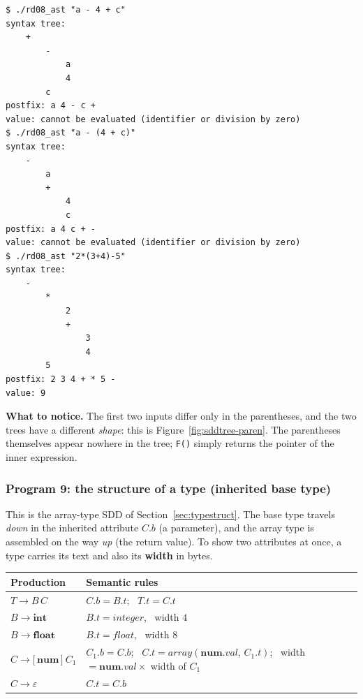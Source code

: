 \documentclass[11pt,a4paper]{article}
\newcommand{\at}[2]{\ensuremath{#1.\mathit{#2}}}
\newcommand{\tok}[1]{\ensuremath{\mathtt{#1}}}
\begin{document}
\begin{lstlisting}[basicstyle=\ttfamily\footnotesize,tabsize=4]
$ ./rd08_ast "a - 4 + c"
syntax tree:
    +
        -
            a
            4
        c
postfix: a 4 - c + 
value: cannot be evaluated (identifier or division by zero)
$ ./rd08_ast "a - (4 + c)"
syntax tree:
    -
        a
        +
            4
            c
postfix: a 4 c + - 
value: cannot be evaluated (identifier or division by zero)
$ ./rd08_ast "2*(3+4)-5"
syntax tree:
    -
        *
            2
            +
                3
                4
        5
postfix: 2 3 4 + * 5 - 
value: 9
\end{lstlisting}

\textbf{What to notice.} The first two inputs differ only in the parentheses, and the two trees have a different \emph{shape}: this is Figure~\ref{fig:sddtree-paren}. The parentheses themselves appear nowhere in the tree; \texttt{F()} simply returns the pointer of the inner expression.

\subsubsection*{Program 9: the structure of a type (inherited base type)}
This is the array-type SDD of Section~\ref{sec:typestruct}. The base type travels \emph{down} in the inherited attribute $C.b$ (a parameter), and the array type is assembled on the way \emph{up} (the return value). To show two attributes at once, a type carries its text and also its \textbf{width} in bytes.
\begin{center}
\small
\begin{tabular}{@{}l l@{}}
\toprule
\textbf{Production} & \textbf{Semantic rules} \\ \midrule
$T \to B\,C$ & $\at{C}{b}=\at{B}{t}$; \ $\at{T}{t}=\at{C}{t}$ \\
$B \to \mathbf{int}$ & $\at{B}{t}=\mathit{integer}$, \ width $4$ \\
$B \to \mathbf{float}$ & $\at{B}{t}=\mathit{float}$, \ width $8$ \\
$C \to \tok{[}\,\mathbf{num}\,\tok{]}\ C_1$ & $\at{C_1}{b}=\at{C}{b}$; \ $\at{C}{t}=\mathit{array}(\at{\mathbf{num}}{val},\,\at{C_1}{t})$; \ width $=\at{\mathbf{num}}{val}\times$ width of $C_1$ \\
$C \to \varepsilon$ & $\at{C}{t}=\at{C}{b}$ \\ \bottomrule
\end{tabular}
\end{center}
\end{document}
